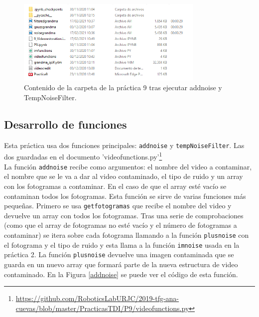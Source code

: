 \begin{figure}[h]
\centering
\includegraphics[width=0.8\textwidth]{imagenes/carpetaP9}
\caption{Contenido de la carpeta de la práctica 9 tras ejecutar addnoise y TempNoiseFilter.}
\label{carpetaP9} 
\end{figure}

\subsection{Desarrollo de funciones}

Esta práctica usa dos funciones principales: \texttt{addnoise} y \texttt{tempNoiseFilter}. Las dos guardadas en el documento 'videofunctions.py'\footnote{\url{https://github.com/RoboticsLabURJC/2019-tfg-ana-cuevas/blob/master/PracticasTDI/P9/videofunctions.py}}\\

La función \texttt{addnoise} recibe como argumentos: el nombre del video a contaminar, el nombre que se le va a dar al video contaminado, el tipo de ruido y un array con los fotogramas a contaminar. En el caso de que el array esté vacío se contaminan todos los fotogramas. Esta función se sirve de varias funciones más pequeñas. Primero se usa \texttt{getfotogramas} que recibe el nombre del video y devuelve un array con todos los fotogramas. Tras una serie de comprobaciones (como que el array de fotogramas no esté vacío y el número de fotogramas a contaminar) se itera sobre cada fotograma llamando a la función \texttt{plusnoise} con el fotograma y el tipo de ruido y esta llama a la función \texttt{imnoise} usada en la práctica 2. La función \texttt{plusnoise} devuelve una imagen contaminada que se guarda en un nuevo array que formará parte de la nueva estructura de video contaminado. En la Figura \ref{addnoise} se puede ver el código de esta función.\\

